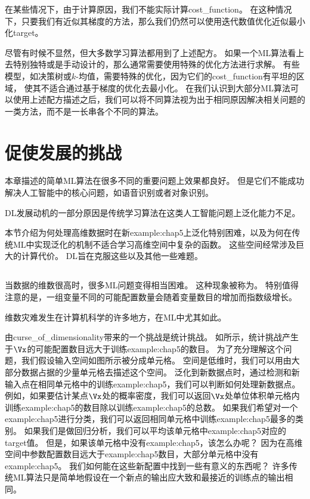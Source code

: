 在某些情况下，由于计算原因，我们不能实际计算\gls{cost_function}。
在这种情况下，只要我们有近似其梯度的方法，那么我们仍然可以使用迭代数值优化近似最小化\gls{target}。

尽管有时候不显然，但大多数学习算法都用到了上述配方。
如果一个\gls{ML}算法看上去特别独特或是手动设计的，那么通常需要使用特殊的优化方法进行求解。
有些模型，如决策树或$k$-均值，需要特殊的优化，因为它们的\gls{cost_function}有平坦的区域，
使其不适合通过基于梯度的优化去最小化。
在我们认识到大部分\gls{ML}算法可以使用上述配方描述之后，我们可以将不同算法视为出于相同原因解决相关问题的一类方法，而不是一长串各个不同的算法。


\section{促使发展的挑战}
\label{sec:challenges_motivating_deep_learning}
本章描述的简单\gls{ML}算法在很多不同的重要问题上效果都良好。
但是它们不能成功解决人工智能中的核心问题，如语音识别或者对象识别。

\gls{DL}发展动机的一部分原因是传统学习算法在这类人工智能问题上泛化能力不足。

本节介绍为何处理高维数据时在新\gls{example:chap5}上泛化特别困难，以及为何在传统\gls{ML}中实现泛化的机制不适合学习高维空间中复杂的函数。
这些空间经常涉及巨大的计算代价。
\gls{DL}旨在克服这些以及其他一些难题。

\subsection{}
\label{sec:the_curse_of_dimensionality}
当数据的维数很高时，很多\gls{ML}问题变得相当困难。
这种现象被称为。
特别值得注意的是，一组变量不同的可能配置数量会随着变量数目的增加而指数级增长。

维数灾难发生在计算机科学的许多地方，在\gls{ML}中尤其如此。

由\gls{curse_of_dimensionality}带来的一个挑战是统计挑战。
如所示，统计挑战产生于$\Vx$的可能配置数目远大于训练\gls{example:chap5}的数目。
为了充分理解这个问题，我们假设输入空间如图所示被分成单元格。
空间是低维时，我们可以用由大部分数据占据的少量单元格去描述这个空间。
泛化到新数据点时，通过检测和新输入点在相同单元格中的训练\gls{example:chap5}，我们可以判断如何处理新数据点。
例如，如果要估计某点$\Vx$处的概率密度，我们可以返回$\Vx$处单位体积单元格内训练\gls{example:chap5}的数目除以训练\gls{example:chap5}的总数。
如果我们希望对一个\gls{example:chap5}进行分类，我们可以返回相同单元格中训练\gls{example:chap5}最多的类别。
如果我们是做回归分析，我们可以平均该单元格中\gls{example:chap5}对应的\gls{target}值。
但是，如果该单元格中没有\gls{example:chap5}，该怎么办呢？  
因为在高维空间中参数配置数目远大于\gls{example:chap5}数目，大部分单元格中没有\gls{example:chap5}。 
我们如何能在这些新配置中找到一些有意义的东西呢？
许多传统\gls{ML}算法只是简单地假设在一个新点的输出应大致和最接近的训练点的输出相同。



